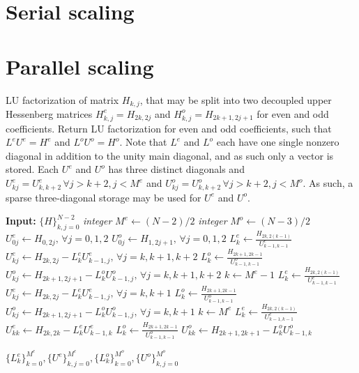 \documentclass[11pt, oneside]{article}
\begin{document}
\section{Serial scaling}

\section{Parallel scaling}



\begin{algorithm}
\caption{LU factorization of matrix $H_{k,j}$, that may be split into two decoupled upper Hessenberg matrices $H^e_{k,j} = H_{2k,2j}$ and $H^o_{k,j} = H_{2k+1,2j+1}$ for even and odd coefficients. Return LU factorization for even and odd coefficients, such that $L^eU^e=H^e$ and $L^oU^o=H^o$. Note that $L^{e}$ and $L^{o}$ each have one single nonzero diagonal in addition to the unity main diagonal, and as such only a vector is stored. Each $U^{e}$ and $U^{o}$ has three distinct diagonals and $U^{e}_{kj}=U^{e}_{k, k+2} \,\forall j > k+2, j< M^e$ and $U^{o}_{kj}=U^{o}_{k, k+2} \,\forall j > k+2, j< M^o$. As such, a sparse three-diagonal storage may be used for $U^e$ and $U^o$.}
\label{alg:lu}
\begin{algorithmic}[1]
  \State \textbf{Input:} $\{H\}_{k,j=0}^{N-2}$
  \State \textit{integer} $M^e \gets (N-2)/2$
  \State \textit{integer} $M^o \gets (N-3)/2$
  \State ${U}^e_{0j} \gets {H}_{0,2j}, \, \forall j=0,1,2 $
  \State ${U}^o_{0j} \gets {H}_{1,2j+1}, \, \forall j=0,1,2 $
    \State ${L}^e_{k} \gets \frac{{H}_{2k,2(k-1)}}{{U}^e_{k-1,k-1}}$
    \State ${U}^e_{kj} \gets {H}_{2k,2j} - {L}^e_{k}{U}^e_{k-1,j}, \, \forall j=k, k+1, k+2$
    \State ${L}^o_{k} \gets \frac{{H}_{2k+1,2k-1}}{{U}^o_{k-1,k-1}}$
    \State ${U}^o_{kj} \gets {H}_{2k+1,2j+1} - {L}^o_{k}{U}^o_{k-1,j}, \, \forall j=k, k+1, k+2$
  \EndFor
  \State $k \gets M^e-1$
  \State ${L}^e_{k} \gets \frac{{H}_{2k,2(k-1)}}{{U}^e_{k-1,k-1}}$
  \State ${U}^e_{kj} \gets {H}_{2k,2j} - {L}^e_{k}{U}^e_{k-1,j}, \, \forall j=k, k+1$
  \State ${L}^o_{k} \gets \frac{{H}_{2k+1,2k-1}}{{U}^o_{k-1,k-1}}$
  \State ${U}^o_{kj} \gets {H}_{2k+1,2j+1} - {L}^o_{k}{U}^o_{k-1,j}, \, \forall j=k, k+1$
  \State $k \gets M^e$
  \State ${L}^e_{k} \gets \frac{{H}_{2k,2(k-1)}}{{U}^e_{k-1,k-1}}$
  \State ${U}^e_{kk} \gets {H}_{2k,2k} - {L}^e_{k}{U}^e_{k-1,k}$
    \State ${L}^o_{k} \gets \frac{{H}_{2k+1,2k-1}}{{U}^o_{k-1,k-1}}$
    \State ${U}^o_{kk} \gets {H}_{2k+1,2k+1} - {L}^o_{k}{U}^o_{k-1,k}$

  \EndIf  
  \State \Return $\{L^e_k\}_{k=0}^{M^e},\{U^e\}_{k,j=0}^{M^e}, \{L^o_k\}_{k=0}^{M^o},\{U^o\}_{k,j=0}^{M^o}$
\EndProcedure
\end{algorithmic}
\end{algorithm}
\end{document}
